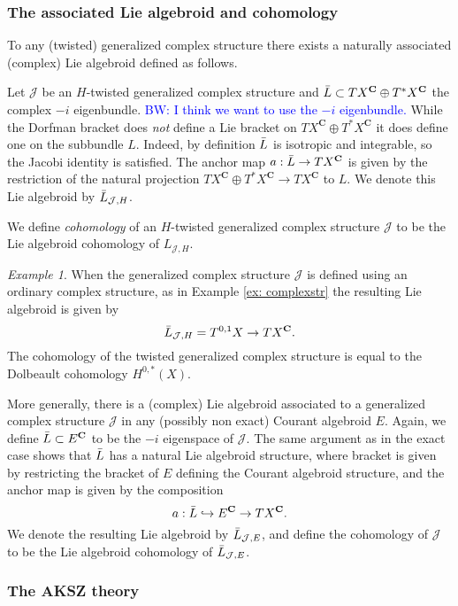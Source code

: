 \documentclass{article}
\newcommand{\JJ}{\mathcal{J}}
\newcommand{\Cc}{\mathbf{C}}
\def\brian{\textcolor{blue}{BW: }\textcolor{blue}}
\theoremstyle{definition}
\theoremstyle{definition}
\theoremstyle{remark}
\newtheorem{Ex}[theorem]{Example}
\begin{document}
\subsubsection{The associated Lie algebroid and cohomology}

To any (twisted) generalized complex structure there exists a naturally associated (complex) Lie algebroid defined as follows.

Let $\JJ$ be an $H$-twisted generalized complex structure and $\Bar{L} \subset T X^{\Cc} \oplus T^* X^{\Cc}$ the complex $-i$ eigenbundle.
\brian{I think we want to use the $-i$ eigenbundle.}
While the Dorfman bracket does {\em not} define a Lie bracket on $T X^{\Cc} \oplus T^* X^{\Cc}$ it does define one on the subbundle $L$.
Indeed, by definition $\Bar{L}$ is isotropic and integrable, so the Jacobi identity is satisfied. 
The anchor map $a : \Bar{L} \to T X^{\Cc}$ is given by the restriction of the natural projection $T X^{\Cc} \oplus T^* X^{\Cc} \to T X^{\Cc}$ to $L$. 
We denote this Lie algebroid by $\Bar{L}_{\JJ, H}$. 

We define {\em cohomology} of an $H$-twisted generalized complex structure $\JJ$ to be the Lie algebroid cohomology of $L_{\JJ, H}$.

\begin{Ex}
When the generalized complex structure $\JJ$ is defined using an ordinary complex structure, as in Example \ref{ex: complexstr} the resulting Lie algebroid is given by 
\[
\Bar{L}_{\JJ, H} = T^{0,1} X \to T X^{\Cc} .
\]
The cohomology of the twisted generalized complex structure is equal to the Dolbeault cohomology $H^{0,*}(X)$. 
\end{Ex}

More generally, there is a (complex) Lie algebroid associated to a generalized complex structure $\JJ$ in any (possibly non exact) Courant algebroid $E$. 
Again, we define $\Bar{L} \subset E^{\Cc} $ to be the $-i$ eigenspace of $\JJ$. 
The same argument as in the exact case shows that $\Bar{L}$ has a natural Lie algebroid structure, where bracket is given by restricting the bracket of $E$ defining the Courant algebroid structure, and the anchor map is given by the composition
\[
a : \Bar{L} \hookrightarrow E^{\Cc} \to T X^{\Cc} .
\]
We denote the resulting Lie algebroid by $\Bar{L}_{\JJ, E}$, and define the cohomology of $\JJ$ to be the Lie algebroid cohomology of $\Bar{L}_{\JJ,E}$. 

\subsubsection{The AKSZ theory}
\end{document}
